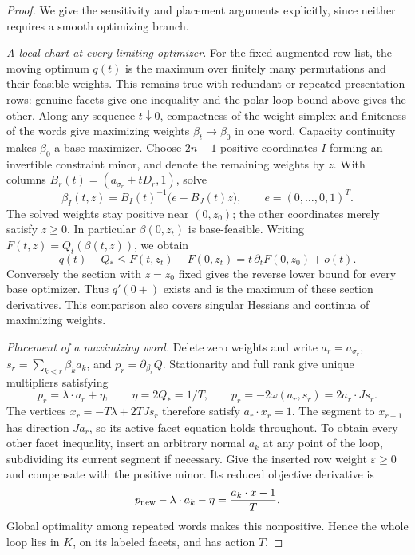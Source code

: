 \begin{proof}
We give the sensitivity and placement arguments explicitly, since neither
requires a smooth optimizing branch.

\emph{A local chart at every limiting optimizer.}
For the fixed augmented row list, the moving optimum $q(t)$ is the maximum
over finitely many permutations and their feasible weights. This remains
true with redundant or repeated presentation rows: genuine facets give one
inequality and the polar-loop bound above gives the other. Along any sequence
$t\downarrow0$, compactness of the weight simplex and finiteness of the words
give maximizing weights $\beta_t\to\beta_0$ in one word. Capacity continuity
makes $\beta_0$ a base maximizer.
Choose $2n+1$ positive coordinates $I$ forming an invertible constraint minor,
and denote the remaining weights by $z$. With columns
$B_r(t)=(a_{\sigma_r}+tD_r,1)$, solve
\[
 \beta_I(t,z)=B_I(t)^{-1}\bigl(e-B_J(t)z\bigr),
 \qquad e=(0,\ldots,0,1)^T.
\]
The solved weights stay positive near $(0,z_0)$; the other coordinates merely
satisfy $z\geq0$. In particular $\beta(0,z_t)$ is base-feasible.
Writing $F(t,z)=Q_t(\beta(t,z))$, we obtain
\[
 q(t)-Q_*\leq F(t,z_t)-F(0,z_t)
             =t\,\partial_tF(0,z_0)+o(t).
\]
Conversely the section with $z=z_0$ fixed gives the reverse lower bound for
every base optimizer. Thus $q'(0+)$ exists and is the maximum of these
section derivatives. This comparison also covers singular Hessians and
continua of maximizing weights.

\emph{Placement of a maximizing word.}
Delete zero weights and write $a_r=a_{\sigma_r}$,
$s_r=\sum_{k<r}\beta_ka_k$, and $p_r=\partial_{\beta_r}Q$.
Stationarity and full rank give unique multipliers satisfying
\[
 p_r=\lambda\cdot a_r+\eta,
 \qquad \eta=2Q_*=1/T,
 \qquad p_r=-2\omega(a_r,s_r)=2a_r\cdot Js_r.
\]
The vertices $x_r=-T\lambda+2TJs_r$ therefore satisfy $a_r\cdot x_r=1$.
The segment to $x_{r+1}$ has direction $Ja_r$, so its active facet equation
holds throughout. To obtain every other facet inequality, insert an arbitrary
normal $a_k$ at any point of the loop, subdividing its current segment if
necessary. Give the inserted row weight $\varepsilon\geq0$ and compensate
with the positive minor. Its reduced objective derivative is
\[
 p_{\rm new}-\lambda\cdot a_k-\eta
   =\frac{a_k\cdot x-1}{T}.
\]
Global optimality among repeated words makes this nonpositive. Hence the
whole loop lies in $K$, on its labeled facets, and has action $T$.


\end{proof}
